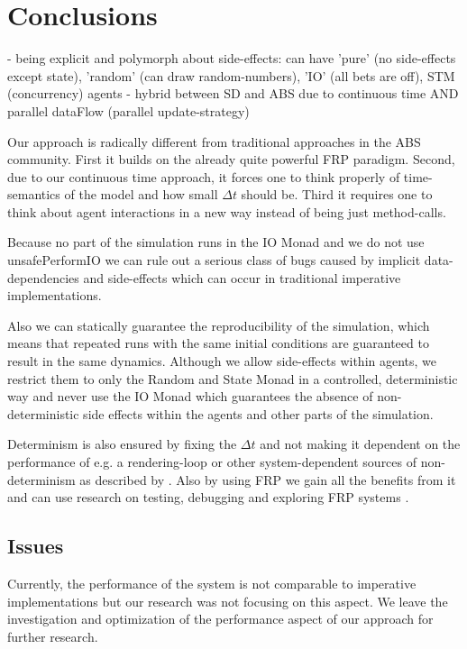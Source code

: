 \section{Conclusions}

- being explicit and polymorph about side-effects: can have 'pure' (no side-effects except state), 'random' (can draw random-numbers), 'IO' (all bets are off), STM (concurrency) agents
- hybrid between SD and ABS due to continuous time AND parallel dataFlow (parallel update-strategy)

Our approach is radically different from traditional approaches in the ABS community. First it builds on the already quite powerful FRP paradigm. Second, due to our continuous time approach, it forces one to think properly of time-semantics of the model and how small $\Delta t$ should be. Third it requires one to think about agent interactions in a new way instead of being just method-calls.

Because no part of the simulation runs in the IO Monad and we do not use unsafePerformIO we can rule out a serious class of bugs caused by implicit data-dependencies and side-effects which can occur in traditional imperative implementations.

Also we can statically guarantee the reproducibility of the simulation, which means that repeated runs with the same initial conditions are guaranteed to result in the same dynamics. Although we allow side-effects within agents, we restrict them to only the Random and State Monad in a controlled, deterministic way and never use the IO Monad which guarantees the absence of non-deterministic side effects within the agents and other parts of the simulation.

Determinism is also ensured by fixing the $\Delta t$ and not making it dependent on the performance of e.g. a rendering-loop or other system-dependent sources of non-determinism as described by \cite{perez_testing_2017}. Also by using FRP we gain all the benefits from it and can use research on testing, debugging and exploring FRP systems \cite{perez_testing_2017, perez_back_2017}.

\subsection*{Issues}
Currently, the performance of the system is not comparable to imperative implementations but our research was not focusing on this aspect. We leave the investigation and optimization of the performance aspect of our approach for further research.

